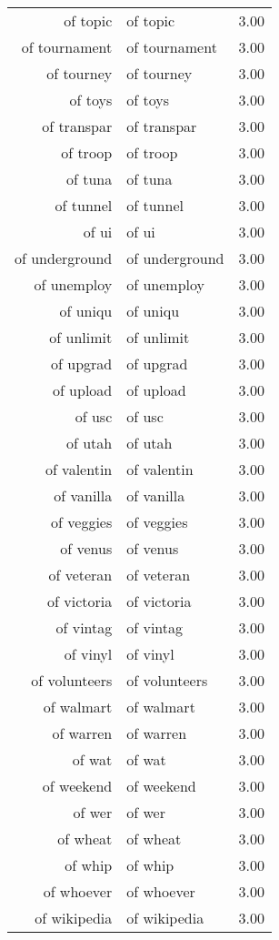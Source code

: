 \begin{table}[ht]
\begin{tabular}{rlr}
  of topic & of topic & 3.00 \\ 
  of tournament & of tournament & 3.00 \\ 
  of tourney & of tourney & 3.00 \\ 
  of toys & of toys & 3.00 \\ 
  of transpar & of transpar & 3.00 \\ 
  of troop & of troop & 3.00 \\ 
  of tuna & of tuna & 3.00 \\ 
  of tunnel & of tunnel & 3.00 \\ 
  of ui & of ui & 3.00 \\ 
  of underground & of underground & 3.00 \\ 
  of unemploy & of unemploy & 3.00 \\ 
  of uniqu & of uniqu & 3.00 \\ 
  of unlimit & of unlimit & 3.00 \\ 
  of upgrad & of upgrad & 3.00 \\ 
  of upload & of upload & 3.00 \\ 
  of usc & of usc & 3.00 \\ 
  of utah & of utah & 3.00 \\ 
  of valentin & of valentin & 3.00 \\ 
  of vanilla & of vanilla & 3.00 \\ 
  of veggies & of veggies & 3.00 \\ 
  of venus & of venus & 3.00 \\ 
  of veteran & of veteran & 3.00 \\ 
  of victoria & of victoria & 3.00 \\ 
  of vintag & of vintag & 3.00 \\ 
  of vinyl & of vinyl & 3.00 \\ 
  of volunteers & of volunteers & 3.00 \\ 
  of walmart & of walmart & 3.00 \\ 
  of warren & of warren & 3.00 \\ 
  of wat & of wat & 3.00 \\ 
  of weekend & of weekend & 3.00 \\ 
  of wer & of wer & 3.00 \\ 
  of wheat & of wheat & 3.00 \\ 
  of whip & of whip & 3.00 \\ 
  of whoever & of whoever & 3.00 \\ 
  of wikipedia & of wikipedia & 3.00 \\ 

\end{tabular}
\end{table}
